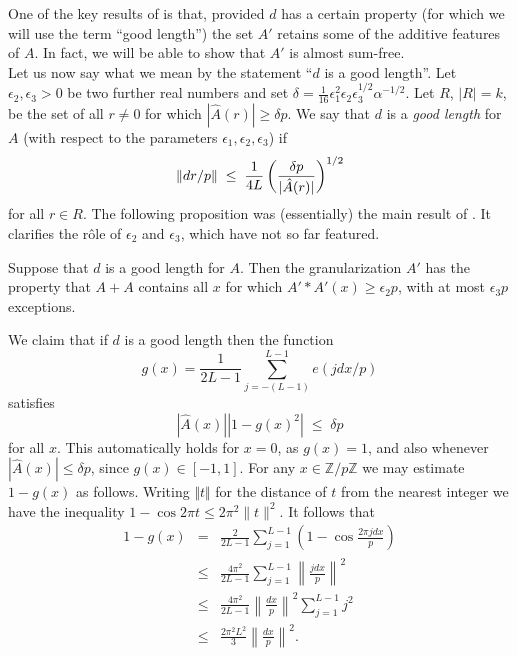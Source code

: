\documentclass[a4paper,12pt]{article}
\begin{document}
One of the key results of \cite{GreenRuz1} is that, provided $d$ has a certain property (for which we will use the term ``good length'') the set $A'$ retains some of the additive features of $A$. In fact, we will be able to show that $A'$ is almost sum-free.\\[11pt]
Let us now say what we mean by the statement ``$d$ is a good length''. Let $\epsilon_2,\epsilon_3 > 0$ be two further real numbers and set $\delta  =\frac{1}{16}\epsilon_1^2\epsilon_2\epsilon_3^{1/2}\alpha ^{-1/2}$.
     Let $R$, $|R| = k$, be the set of all $r \neq  0$ for which $|\hat{A}(r) |\geq \delta  p
$. We say that $d$ is a \textit{good length} for $A$ (with respect to the parameters $\epsilon_1,\epsilon_2,\epsilon_3$) if
\begin{equation}\label{goodlength} \|dr/p\| \; \leq \;  {1\over 4L}\left( \frac{\delta p}{ |\hat{A}(r) |}\right )^{1/2}\end{equation}
for all $r\in R$. The following proposition was (essentially) the main result of \cite{GreenRuz1}. It clarifies the r\^ole of $\epsilon_2$ and $\epsilon_3$, which have not so far featured.
\begin{propositionenv}\label{prop111}
Suppose that
$d$ is a good length for $A$. Then the granularization $A'$ has the property that $A + A$ contains all $x$ for which $A' \ast A'(x) \geq \epsilon_2
p$, with at most $\epsilon_3 p$ exceptions.
\end{propositionenv}
\proof We claim that if $d$ is a good length then the function
\begin{equation}\label{eq766} g(x) = \frac{1}{2L - 1}\sum_{j = -(L-1)}^{L-1} e(jdx/p)\end{equation} satisfies
\begin{equation}\label{r1}
      |\hat{A}(x) | |1 - g(x)^2 |\;\leq \;\delta  p
    \end{equation}
     for all $x$. This automatically holds for $x=0$, as $g(x)=1$, and also
whenever $|\hat{A}(x)|\leq\delta p$, since $g(x)\in  [-1, 1]$. 
For any $x \in \mathbb{Z}/p\mathbb{Z}$ we may estimate $1-g(x)$ as follows. Writing $\Vert t\Vert$ for the distance of $t$ from
the nearest integer we have the inequality
    $1-\cos 2\pi t\leq  2\pi^2\| t\|^2$. It follows that
    \begin{eqnarray}
    \nonumber 1-g(x) & = & \frac{2}{2L-1}\sum_{j = 1}^{L-1}\left( 1 -\cos \frac{2\pi jdx}{ p}\right)\\
    \nonumber &\leq  & \frac{4\pi^2}{2L-1}\sum_{j = 1}^{L-1}\left\|  \frac{jdx}{p}\right\|^2\\
    \nonumber &\leq  & \frac{4\pi^2}{2L-1} \left\| \frac{dx}{p}\right\|^2\sum_{j = 1}^{ L-1}  j^2\\
    \label{r2} &\leq  & \frac{2\pi^2L^2}{3}\left\|  \frac{dx}{p}\right\|^2.
    \end{eqnarray}
\end{document}
